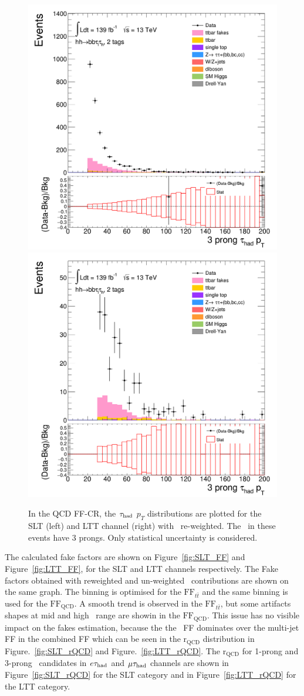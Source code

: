 \begin{figure}[htbp]
\centering
\includegraphics[width=.45\textwidth]{DiHiggs/plots/FF_CRs/InvCR_SLT/HNone/BDTVarsHighMbb/2/C_2tag2pjet_0ptv_TauPt3P.png}
\includegraphics[width=.45\textwidth]{DiHiggs/plots/FF_CRs/InvCR_LTT/HNone/BDTVarsHighMbb/2/C_2tag2pjet_0ptv_TauPt3P.png}\\
\caption{In the QCD FF-CR, the $\tau_{\mathrm{had}}$ $p_T$ distributions are plotted 
for the SLT (left) and LTT channel (right) 
with \ttbar\ re-weighted.
The \tauhad\ in these events have 3 prongs. 
Only statistical uncertainty is considered.}
\label{fig:InvCR_3}
\end{figure} 

The calculated fake factors are shown on Figure~\ref{fig:SLT_FF} and Figure~\ref{fig:LTT_FF}, 
for the SLT and LTT channels respectively. 
The Fake factors obtained with reweighted and un-weighted \ttbar\ contributions are shown on the
same graph. 
The binning is optimised for the $\text{FF}_{t\bar{t}}$ and the same binning is used for the 
$\text{FF}_\text{QCD}$. A smooth trend is observed in the $\text{FF}_{t\bar{t}}$, 
but some artifacts shapes at mid and high \pt\ range are showin in the $\text{FF}_\text{QCD}$.
This issue has no visible impact on the fakes estimation, because the 
the \ttbar\ FF dominates over the multi-jet FF in the combined FF which can be seen 
in the $\mathrm{r}_\text{QCD}$ distribution in Figure.~\ref{fig:SLT_rQCD} and Figure.~\ref{fig:LTT_rQCD}. 
The  $\mathrm{r}_{\mathrm{QCD}}$ 
for 1-prong and 3-prong \tauhad\ candidates in $e\tau_{\mathrm{had}}$ and $\mu\tau_{\mathrm{had}}$ channels 
are shown in Figure~\ref{fig:SLT_rQCD} for the SLT category and 
in Figure~\ref{fig:LTT_rQCD} for the LTT category.




